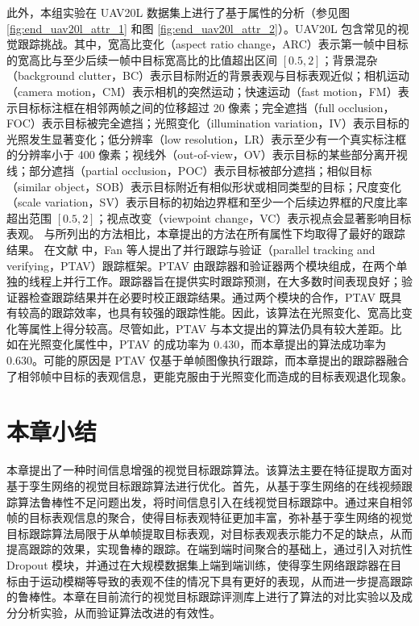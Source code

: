 此外，本组实验在 UAV20L 数据集上进行了基于属性的分析（参见图 \ref{fig:end_uav20l_attr_1} 和图 \ref{fig:end_uav20l_attr_2}）。UAV20L 包含常见的视觉跟踪挑战。其中，宽高比变化（aspect ratio change，ARC）表示第一帧中目标的宽高比与至少后续一帧中目标宽高比的比值超出区间 $[0.5, 2]$；背景混杂（background clutter，BC）表示目标附近的背景表观与目标表观近似；相机运动（camera motion，CM）表示相机的突然运动；快速运动（fast motion，FM）表示目标标注框在相邻两帧之间的位移超过 20 像素；完全遮挡（full occlusion，FOC）表示目标被完全遮挡；光照变化（illumination variation，IV）表示目标的光照发生显著变化；低分辨率（low resolution，LR）表示至少有一个真实标注框的分辨率小于 400 像素；视线外（out-of-view，OV）表示目标的某些部分离开视线；部分遮挡（partial occlusion，POC）表示目标被部分遮挡；相似目标（similar object，SOB）表示目标附近有相似形状或相同类型的目标；尺度变化（scale variation，SV）表示目标的初始边界框和至少一个后续边界框的尺度比率超出范围 $[0.5, 2]$；视点改变（viewpoint change，VC）表示视点会显著影响目标表观。
与所列出的方法相比，本章提出的方法在所有属性下均取得了最好的跟踪结果。
在文献 \cite{fan2018parallel} 中，Fan 等人提出了并行跟踪与验证（parallel tracking and verifying，PTAV）跟踪框架。PTAV 由跟踪器和验证器两个模块组成，在两个单独的线程上并行工作。跟踪器旨在提供实时跟踪预测，在大多数时间表现良好；验证器检查跟踪结果并在必要时校正跟踪结果。通过两个模块的合作，PTAV 既具有较高的跟踪效率，也具有较强的跟踪性能。因此，该算法在光照变化、宽高比变化等属性上得分较高。尽管如此，PTAV 与本文提出的算法仍具有较大差距。比如在光照变化属性中，PTAV 的成功率为 0.430，而本章提出的算法成功率为 0.630。可能的原因是 PTAV 仅基于单帧图像执行跟踪，而本章提出的跟踪器融合了相邻帧中目标的表观信息，更能克服由于光照变化而造成的目标表观退化现象。

\section{本章小结}
本章提出了一种时间信息增强的视觉目标跟踪算法。该算法主要在特征提取方面对基于孪生网络的视觉目标跟踪算法进行优化。首先，从基于孪生网络的在线视频跟踪算法鲁棒性不足问题出发，将时间信息引入在线视觉目标跟踪中。通过来自相邻帧的目标表观信息的聚合，使得目标表观特征更加丰富，弥补基于孪生网络的视觉目标跟踪算法局限于从单帧提取目标表观，对目标表观表示能力不足的缺点，从而提高跟踪的效果，实现鲁棒的跟踪。在端到端时间聚合的基础上，通过引入对抗性 Dropout 模块，并通过在大规模数据集上端到端训练，使得孪生网络跟踪器在目标由于运动模糊等导致的表观不佳的情况下具有更好的表现，从而进一步提高跟踪的鲁棒性。本章在目前流行的视觉目标跟踪评测库上进行了算法的对比实验以及成分分析实验，从而验证算法改进的有效性。